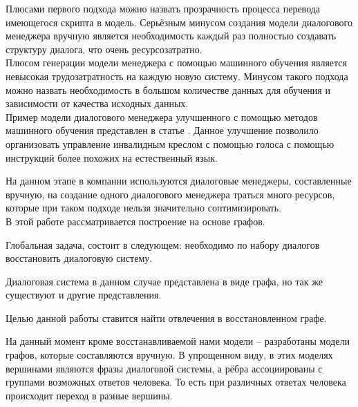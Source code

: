 \documentclass[specification,annotation]{itmo-student-thesis}
\begin{document}
	Плюсами первого подхода можно назвать прозрачность процесса перевода имеющегося скрипта в модель. Серьёзным минусом создания модели диалогового менеджера вручную является необходимость каждый раз полностью создавать структуру диалога, что очень ресурсозатратно.\\
	
	Плюсом генерации модели менеджера с помощью машинного обучения является невысокая трудозатратность на каждую новую систему. Минусом такого подхода можно назвать необходимость в большом количестве данных для обучения и зависимости от качества исходных данных.\\
	
	Пример модели диалогового менеджера улучшенного с помощью методов машинного обучения представлен в статье \cite{human-robot-inter}. Данное улучшение позволило организовать управление инвалидным креслом с помощью голоса с помощью инструкций более похожих на естественный язык.
	
	На данном этапе в компанни используются диалоговые менеджеры, составленные вручную, на создание одного диалогового менеджера траться много ресурсов, которые при таком подходе нельзя значительно соптимизировать.\\
	
	В этой работе рассматривается построение на основе графов.
	
	
	Глобальная задача, состоит в следующем: необходимо по набору диалогов восстановить диалоговую систему.
	
	Диалоговая система в данном случае представлена в виде графа, но так же существуют и другие представления.
	
	Целью данной работы ставится найти отвлечения в восстановленном графе.
	
	На данный момент кроме восстанавливаемой нами модели -- разработаны модели графов, которые составляются вручную. В упрощенном виду, в этих моделях вершинами являются фразы диалоговой системы, а рёбра ассоциированы с группами возможных ответов человека. То есть при различных ответах человека происходит переход в разные вершины.%
	
\end{document}
